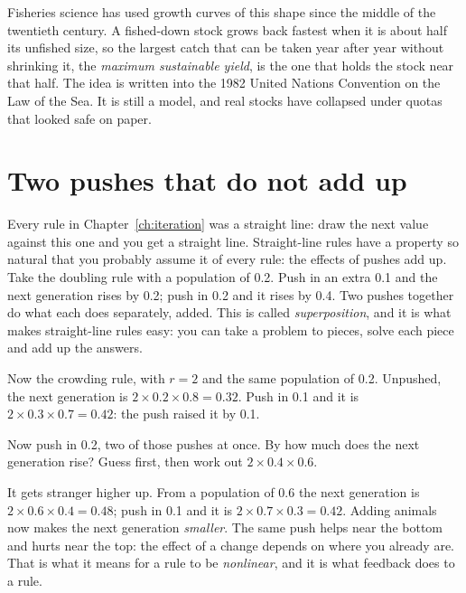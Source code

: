 
\begin{worldbox}
Fisheries science has used growth curves of this shape since the middle of
the twentieth century. A fished-down stock grows back fastest when it is
about half its unfished size, so the largest catch that can be taken year
after year without shrinking it, the \emph{maximum sustainable yield}, is
the one that holds the stock near that half. The idea is written into the
1982 United Nations Convention on the Law of the Sea. It is still a model,
and real stocks have collapsed under quotas that looked safe on paper.
\end{worldbox}

\section{Two pushes that do not add up}
\label{sec:ch03-superposition}

\noindent
Every rule in Chapter~\ref{ch:iteration} was a straight line: draw the next
value against this one and you get a straight line. Straight-line rules have
a property so natural that you probably assume it of every rule: the effects
of pushes add up. Take the doubling rule with a population of \num{0.2}. Push
in an extra \num{0.1} and the next generation rises by \num{0.2}; push in
\num{0.2} and it rises by \num{0.4}. Two pushes together do what each does
separately, added. This is called \emph{superposition}, and it is what makes
straight-line rules easy: you can take a problem to pieces, solve each piece
and add up the answers.

Now the crowding rule, with $r = 2$ and the same population of \num{0.2}.
Unpushed, the next generation is $2 \times \num{0.2} \times \num{0.8} =
\num{0.32}$. Push in \num{0.1} and it is $2 \times \num{0.3} \times \num{0.7}
= \num{0.42}$: the push raised it by \num{0.1}.

\begin{think}
Now push in \num{0.2}, two of those pushes at once. By how much does the
next generation rise? Guess first, then work out $2 \times \num{0.4} \times
\num{0.6}$.
\end{think}
It gets stranger higher up. From a population of \num{0.6} the next
generation is $2 \times \num{0.6} \times \num{0.4} = \num{0.48}$; push in
\num{0.1} and it is $2 \times \num{0.7} \times \num{0.3} = \num{0.42}$.
Adding animals now makes the next generation \emph{smaller}. The same push
helps near the bottom and hurts near the top: the effect of a change depends
on where you already are. That is what it means for a rule to be
\emph{nonlinear}, and it is what feedback does to a rule.

